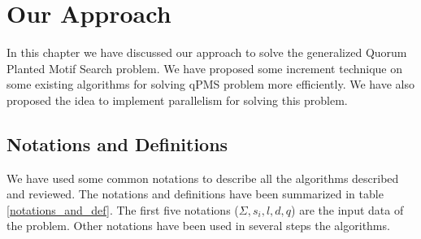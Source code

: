 \chapter{Our Approach}\label{ourapproach}

In this chapter we have discussed our approach to solve the generalized Quorum Planted Motif Search problem. We have proposed some increment technique on some existing algorithms for solving qPMS problem more efficiently. We have also proposed the idea to implement parallelism for solving this problem.

\section{Notations and Definitions}
We have used some common notations to describe all the algorithms described and reviewed. The notations and definitions have been summarized in table \cref{notations_and_def}. The first five notations ($\Sigma, s_i, l, d, q$) are the input data of the problem. Other notations have been used in several steps the algorithms. 


